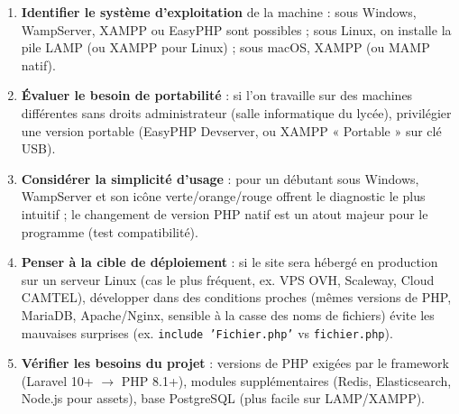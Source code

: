 \documentclass[11pt]{article}
\begin{document}
\begin{methode}
\begin{enumerate}
\item \textbf{Identifier le système d'exploitation} de la machine : sous Windows, WampServer, XAMPP ou EasyPHP sont possibles ; sous Linux, on installe la pile LAMP (ou XAMPP pour Linux) ; sous macOS, XAMPP (ou MAMP natif).
\item \textbf{Évaluer le besoin de portabilité} : si l'on travaille sur des machines différentes sans droits administrateur (salle informatique du lycée), privilégier une version portable (EasyPHP Devserver, ou XAMPP « Portable » sur clé USB).
\item \textbf{Considérer la simplicité d'usage} : pour un débutant sous Windows, WampServer et son icône verte/orange/rouge offrent le diagnostic le plus intuitif ; le changement de version PHP natif est un atout majeur pour le programme (test compatibilité).
\item \textbf{Penser à la cible de déploiement} : si le site sera hébergé en production sur un serveur Linux (cas le plus fréquent, ex. VPS OVH, Scaleway, Cloud CAMTEL), développer dans des conditions proches (mêmes versions de PHP, MariaDB, Apache/Nginx, sensible à la casse des noms de fichiers) évite les mauvaises surprises (ex. \texttt{include 'Fichier.php'} vs \texttt{fichier.php}).
\item \textbf{Vérifier les besoins du projet} : versions de PHP exigées par le framework (Laravel 10+ $\rightarrow$ PHP 8.1+), modules supplémentaires (Redis, Elasticsearch, Node.js pour assets), base PostgreSQL (plus facile sur LAMP/XAMPP).
\end{enumerate}
\end{methode}
\end{document}
